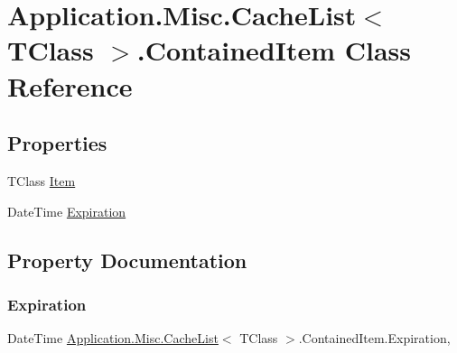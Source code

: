 \hypertarget{class_application_1_1_misc_1_1_cache_list_1_1_contained_item}{}\section{Application.\+Misc.\+Cache\+List$<$ T\+Class $>$.Contained\+Item Class Reference}
\label{class_application_1_1_misc_1_1_cache_list_1_1_contained_item}
\subsection*{Properties}
\begin{DoxyCompactItemize}
\item 
T\+Class \mbox{\hyperlink{class_application_1_1_misc_1_1_cache_list_1_1_contained_item_a7799bd7352a769f1f7ff540d369d4743}{Item}}
\item 
Date\+Time \mbox{\hyperlink{class_application_1_1_misc_1_1_cache_list_1_1_contained_item_a5d6865f58fd14bfcf4d9ceb6dba91b84}{Expiration}}
\end{DoxyCompactItemize}


\subsection{Property Documentation}
\mbox{\label{class_application_1_1_misc_1_1_cache_list_1_1_contained_item_a5d6865f58fd14bfcf4d9ceb6dba91b84}} 
\subsubsection{\texorpdfstring{Expiration}{Expiration}}
{\footnotesize\ttfamily Date\+Time \mbox{\hyperlink{class_application_1_1_misc_1_1_cache_list}{Application.\+Misc.\+Cache\+List}}$<$ T\+Class $>$.Contained\+Item.\+Expiration\hspace{0.3cm}{\ttfamily [get]}, {\ttfamily [set]}}

